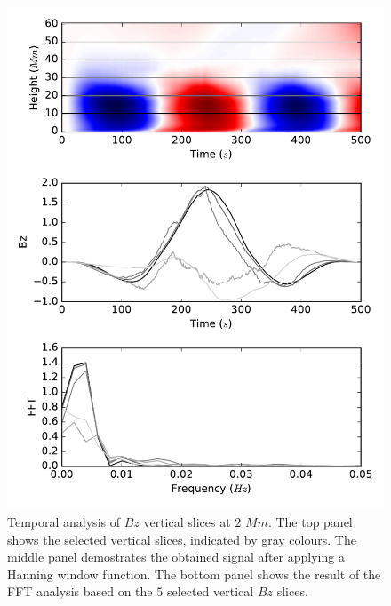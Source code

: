 \documentclass[twocolumn]{aastex62}
\begin{document}
\begin{figure}
    \centering
    \label{fft_sim}
    \includegraphics[scale=0.55]{imrescale/fft_sim.pdf}
    \caption{Temporal analysis of $Bz$ vertical slices at $2$ $Mm$. The top panel shows the selected vertical slices, indicated by gray colours. The middle panel demostrates the obtained signal after applying a Hanning window function. The bottom panel shows the result of the FFT analysis based on the $5$ selected vertical $Bz$ slices.}


\end{figure}
\end{document}
